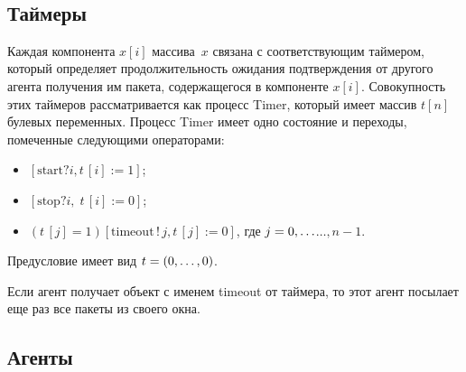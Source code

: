 \begin{multicols}{2}
\begin{figure*}[b] %
\vspace*{1pt}
\begin{center}
\mbox{%
\epsfxsize=124.723mm
}
\end{center}
\vspace*{-9pt}
\end{figure*}

\vspace*{-4pt}

\subsection{Таймеры}

Каждая компонента $x[i]$  массива~$x$ связана с соответствующим таймером,
который определяет продолжительность ожидания подтверждения от другого агента
получения им пакета, содержащегося в компоненте $x[i]$.
Совокупность этих таймеров рассматривается как процесс Timer, который имеет массив
$t [n]$ булевых переменных. Процесс Timer имеет одно состояние и переходы,
помеченные следующими операторами:
\begin{itemize}
\item $[\mathrm{start}?i , t\,[i]:=1]$;
\item $[\mathrm{stop}?i,\; t\,[i]:=0]$;
\item $(t\,[j]=1)[ \mathrm{timeout}\,!\,j, t\,[j]:=0]$,
где $j \hm= 0,\ldots$\linebreak $\ldots , n-1$.
\end{itemize}

Предусловие имеет вид $t \hm= (0,\ldots,0)$.

Если агент получает объект с именем timeout от таймера, то этот агент посылает
еще раз все пакеты из своего окна.

\vspace*{-4pt}

\subsection{Агенты}


\end{multicols}

